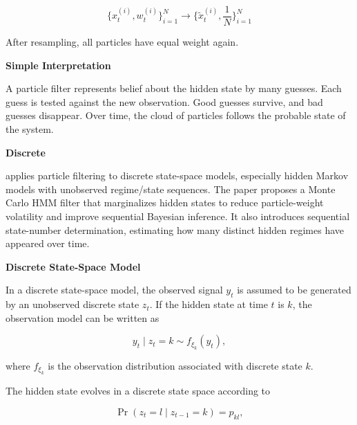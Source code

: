 \documentclass{book}
\providecommand{\ProjectDeepHeading}[2]{%
    \par\medskip\noindent\textbf{#2}\par\smallskip
}
\begin{document}
        \begin{equation}
            \{x_t^{(i)}, w_t^{(i)}\}_{i=1}^{N}
            \rightarrow
            \{\tilde{x}_t^{(i)}, \frac{1}{N}\}_{i=1}^{N}
        \end{equation}
        
        After resampling, all particles have equal weight again.
    
    
    \ProjectDeepHeading{11}{Simple Interpretation}
        
        A particle filter represents belief about the hidden state by many guesses.
        Each guess is tested against the new observation.
        Good guesses survive, and bad guesses disappear.
        Over time, the cloud of particles follows the probable state of the system.

\ProjectDeepHeading{9}{Discrete}


\cite{chopin-2001-sequential-inference-and-state-number-determination-for-discrete-state-space-models-through-particle-filtering} applies particle filtering to discrete state-space models, especially hidden Markov models with unobserved regime/state sequences. The paper proposes a Monte Carlo HMM filter that marginalizes hidden states to reduce particle-weight volatility and improve sequential Bayesian inference. It also introduces sequential state-number determination, estimating how many distinct hidden regimes have appeared over time.
    
    
    \ProjectDeepHeading{12}{Discrete State-Space Model}
        
        In a discrete state-space model, the observed signal \(y_t\) is assumed to be generated by an unobserved discrete state \(z_t\). If the hidden state at time \(t\) is \(k\), the observation model can be written as
        
        \[
            y_t
            \mid
            z_t = k
            \sim
            f_{\ensuremath{\xi}_k}(y_t),
        \]
        
        where \(f_{\ensuremath{\xi}_k}\) is the observation distribution associated with discrete state \(k\).
        
        The hidden state evolves in a discrete state space according to
        
        \[
            \Pr
            \left(
                z_t = l
                \mid
                z_{t-1} = k
            \right)
            =
            p_{kl},
        \]
        
\end{document}
